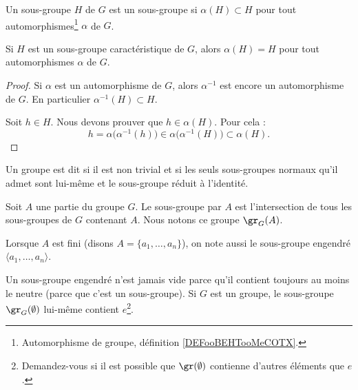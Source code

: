 \begin{definition}      \label{DEFooUXXTooCCLmQe}
    Un sous-groupe \( H\) de \( G\) est un sous-groupe  si \( \alpha(H)\subset H\) pour tout automorphismes\footnote{Automorphisme de groupe, définition \ref{DEFooBEHTooMeCOTX}.} \( \alpha\) de \( G\).
\end{definition}

\begin{lemma}
    Si \( H\) est un sous-groupe caractéristique de \( G\), alors \( \alpha(H)=H\) pour tout automorphismes \( \alpha\) de \( G\).
\end{lemma}

\begin{proof}
    Si \( \alpha\) est un automorphisme de \( G\), alors \( \alpha^{-1}\) est encore un automorphisme de \( G\). En particulier \( \alpha^{-1}(H)\subset H\).

    Soit \( h\in H\). Nous devons prouver que \( h\in \alpha(H)\). Pour cela :
    \begin{equation}
        h=\alpha\big( \alpha^{-1}(h) \big)\in \alpha\big( \alpha^{-1}(H) \big)\subset\alpha(H).
    \end{equation}
\end{proof}

\begin{definition}   \label{DefGroupeSimple}
    Un groupe est dit  si il est non trivial et si les seuls sous-groupes normaux qu'il admet sont lui-même et le sous-groupe réduit à l'identité.
\end{definition}

\begin{definition}        \label{DefooRDRXooEhVxxu}
    Soit \( A\) une partie du groupe \( G\). Le sous-groupe  par \( A\) est l'intersection de tous les sous-groupes de \( G\) contenant \( A\). Nous notons ce groupe \( \gr_G(A)\).

    Lorsque \( A \) est fini (disons \( A = \{a_1, \dots, a_n\} \)), on note aussi le sous-groupe engendré \( \langle a_1, \dots, a_n \rangle \).
\end{definition}

\begin{normaltext}
    Un sous-groupe engendré n'est jamais vide parce qu'il contient toujours au moins le neutre (parce que c'est un sous-groupe). Si \( G\) est un groupe, le sous-groupe \( \gr_G(\emptyset)\) lui-même contient \( e\)\footnote{Demandez-vous si il est possible que \( \gr(\emptyset)\) contienne d'autres éléments que \( e\).}.
\end{normaltext}

